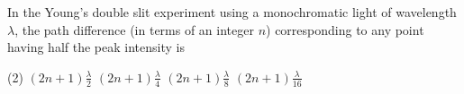 
\item In the Young's double slit experiment using a monochromatic light of wavelength $\lambda$, the path difference (in terms of an integer $n$) corresponding to any point having half the peak intensity is
    \begin{tasks}(2)
        \task $(2n+1)\frac{\lambda}{2}$
        \task $(2n+1)\frac{\lambda}{4}$
        \task $(2n+1)\frac{\lambda}{8}$
        \task $(2n+1)\frac{\lambda}{16}$
    \end{tasks}
